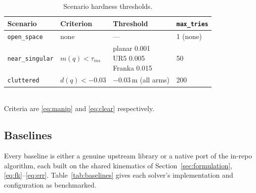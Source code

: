\documentclass[10pt,conference]{IEEEtran}
\begin{document}
\begin{table}[t]
\centering
\caption{Scenario hardness thresholds.}
\label{tab:thresholds}
\footnotesize
\begin{tabular}{@{}llll@{}}
\toprule
Scenario & Criterion & Threshold & \texttt{max\_tries} \\
\midrule
\texttt{open\_space} & none & --- & 1 (none) \\
\texttt{near\_singular} & $m(q) < \tau_{ms}$ & \makecell[l]{planar 0.001\\UR5 0.005\\Franka 0.015} & 50 \\
\texttt{cluttered} & $d(q) < -0.03$ & $-0.03$\,m (all arms) & 200 \\
\bottomrule
\end{tabular}\\[2pt]
{\footnotesize Criteria are \eqref{eq:manip} and \eqref{eq:clear} respectively.}
\end{table}

\subsection{Baselines}
\label{sec:baselines}

Every baseline is either a genuine upstream library or a native port of the
in-repo algorithm, each built on the shared kinematics of
Section~\ref{sec:formulation}, \eqref{eq:fk}--\eqref{eq:err}.
Table~\ref{tab:baselines} gives each solver's implementation and configuration as
benchmarked.
\end{document}
